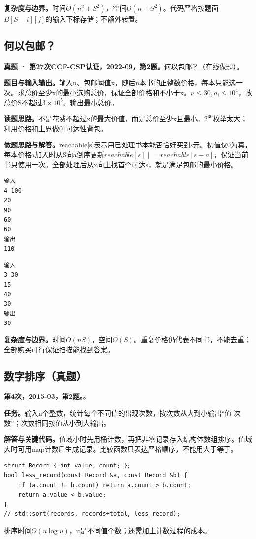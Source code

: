 \noindent\textbf{复杂度与边界。}时间$O(n^2+S^2)$，空间$O(n+S^2)$。代码严格按题面$B[S-i][j]$的输入下标存储；不额外转置。
\subsection{何以包邮？}
\textbf{真题 · 第27次CCF-CSP认证，2022-09，第2题。}\href{https://www.acwing.com/problem/content/4703/}{何以包邮？（在线做题）}。

\noindent\textbf{题目与输入输出。}输入n、包邮阈值x，随后n本书的正整数价格，每本只能选一次。求总价至少x的最小选购总价，保证全部价格和不小于x。$n\le30,a_i\le10^4$，故总价S不超过$3\times10^5$。输出最小总价。

\noindent\textbf{读题思路。}不是花费不超过x的最大价值，而是总价至少x且最小。$2^{30}$枚举太大；利用价格和上界做01可达性背包。

\noindent\textbf{做题思路与解答。}reachable[s]表示用已处理书本能否恰好买到s元。初值仅0为真，每本价格a加入时从S向a倒序更新$reachable[s]\mathrel{|}=reachable[s-a]$，保证当前书只使用一次。全部处理后从x向上找首个可达s，就是满足包邮的最小价格。
\begin{verbatim}
输入
4 100
20
90
60
60
输出
110
\end{verbatim}
\begin{verbatim}
输入
3 30
15
40
30
输出
30
\end{verbatim}

\noindent\textbf{复杂度与边界。}时间$O(nS)$，空间$O(S)$。重复价格仍代表不同书，不能去重；全部购买可行保证扫描能找到答案。

\subsection{数字排序（真题）}
\textbf{第4次，2015-03，第2题。}。

\noindent\textbf{任务。}输入n个整数，统计每个不同值的出现次数，按次数从大到小输出“值 次数”；次数相同按值从小到大输出。

\noindent\textbf{解答与关键代码。}值域小时先用桶计数，再把非零记录存入结构体数组排序。值域大时可用map计数后生成记录。比较函数只表达严格顺序，不能用大于等于。
\begin{lstlisting}
struct Record { int value, count; };
bool less_record(const Record &a, const Record &b) {
    if (a.count != b.count) return a.count > b.count;
    return a.value < b.value;
}
// std::sort(records, records+total, less_record);
\end{lstlisting}
排序时间$O(u\log u)$，u是不同值个数；还需加上计数过程的成本。
